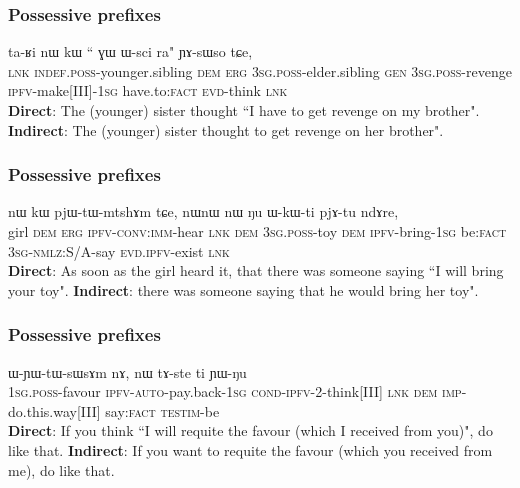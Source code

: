 \documentclass[xcolor=table]{beamer}
\newcommand{\rouge}[1]{{\color{red}#1}}
\newcommand{\bleu}[1]{{\color{blue}#1}}
\newcommand{\ipa}[1]{{\phon #1}} %
\begin{document}
   \begin{frame} 
   \frametitle{Possessive prefixes}
\begin{exe}
\ex
\gll  \ipa{tɕe}  	\ipa{ta-ʁi}  	\ipa{nɯ}  	\ipa{kɯ}  	``\rouge{\ipa{ɯ-pi}}  	\ipa{ɣɯ}  	\ipa{ɯ-sci}  	\bleu{\ipa{tu-nɤme-a}}  	\ipa{ra}" 	\ipa{ɲɤ-sɯso}  	\ipa{tɕe,}  	\\
\textsc{lnk}  \textsc{indef.poss}-younger.sibling \textsc{dem} \textsc{erg}  \rouge{\textsc{3sg.poss}-elder.sibling}  \textsc{gen} \textsc{3sg.poss}-revenge \bleu{\textsc{ipfv}-make[III]-\textsc{1sg}} have.to:\textsc{fact} \textsc{evd}-think \textsc{lnk} \\
\glt  \textbf{Direct}: The (younger) sister thought ``\bleu{I have to get revenge} on \rouge{my brother}".
\glt  \textbf{Indirect}:  The (younger) sister thought  to get revenge on \rouge{her brother}".
  \end{exe}
 \end{frame} 
 

    \begin{frame} 
       \frametitle{Possessive prefixes}
\begin{exe}
\ex
\gll   \ipa{tɤɕime}  	\ipa{nɯ}  	\ipa{kɯ}  	\ipa{pjɯ-tɯ-mtshɤm}  	\ipa{tɕe,}  	\ipa{nɯnɯ}  \rouge{\ipa{ɯ-kɯmtɕhɯ}}  	\ipa{nɯ}  	\bleu{\ipa{ju-ɣɯt-a}}  	\ipa{ŋu}  		\ipa{ɯ-kɯ-ti}  	\ipa{pjɤ-tu}  	\ipa{ndɤre,}  \\
girl \textsc{dem} \textsc{erg} \textsc{ipfv-conv:imm}-hear \textsc{lnk} \textsc{dem} \rouge{\textsc{3sg.poss}-toy} \textsc{dem} \bleu{\textsc{ipfv}-bring-\textsc{1sg}}  be:\textsc{fact} \textsc{3sg-nmlz}:S/A-say \textsc{evd.ipfv}-exist \textsc{lnk} \\
\glt   \textbf{Direct}: As soon as the girl heard it, that there was someone saying ``\bleu{I will bring} \rouge{your toy}".
\glt   \textbf{Indirect}: there was someone saying that he would bring \rouge{her toy}".
  \end{exe}
 \end{frame} 

 
     \begin{frame} 
        \frametitle{Possessive prefixes}
\begin{exe}
\ex
\gll   \rouge{\ipa{a-tʂɯnlɤn}}  	\bleu{\ipa{ɲɯ-nɯ-fsɯɣ-a}}  	\ipa{ɯ-ɲɯ-tɯ-sɯsɤm}  	\ipa{nɤ,}  	\ipa{nɯ}  	\ipa{tɤ-ste}  	\ipa{ti}  \ipa{ɲɯ-ŋu} \\
 \rouge{\textsc{1sg.poss}-favour} \bleu{\textsc{ipfv-auto}-pay.back-\textsc{1sg}} \textsc{cond-ipfv}-2-think[III] \textsc{lnk} \textsc{dem} \textsc{imp}-do.this.way[III] say:\textsc{fact} \textsc{testim}-be \\
 \glt    \textbf{Direct}: If you think ``\bleu{I will requite} the \rouge{favour} (which I received from \rouge{you})", do like that.
\glt    \textbf{Indirect}: If you want to requite the \rouge{favour} (which you received from \rouge{me}), do like that.
  \end{exe}
 \end{frame} 
 
 
 
 
 
  \begin{frame} 

 

 
 \end{frame} 
\end{document}
